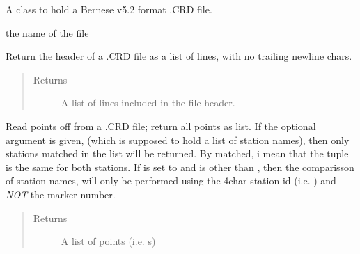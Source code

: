 \documentclass[letterpaper,10pt,english]{sphinxmanual}
\begin{document}

\begin{fulllineitems}
\label{bcrd:bcrd.crdfile}
A class to hold a Bernese v5.2 format .CRD file.

\begin{fulllineitems}
\label{bcrd:bcrd.crdfile.filename_}
the name of the file

\end{fulllineitems}


\begin{fulllineitems}
\label{bcrd:bcrd.crdfile.getFileHeader}
Return the header of a .CRD file as a list of lines,
with no trailing newline chars.
\begin{quote}\begin{description}
\item[{Returns}] \leavevmode
A list of lines included in the file header.

\end{description}\end{quote}

\end{fulllineitems}


\begin{fulllineitems}
\label{bcrd:bcrd.crdfile.getListOfPoints}
Read points off from a .CRD file; return all points as list.
If the optional argument  is given, (which is supposed
to hold a list of station names), then only stations matched
in the  list will be returned. By matched, i mean that
the tuple  is the same for both
stations.
If  is set to  and  is other 
than , then the comparisson of station names, will only 
be performed using the 4char station id (i.e. ) and 
\emph{NOT} the marker number.
\begin{quote}\begin{description}
\item[{Returns}] \leavevmode
A list of points (i.e.  s)

\end{description}\end{quote}

\end{fulllineitems}


\end{fulllineitems}
\end{document}

